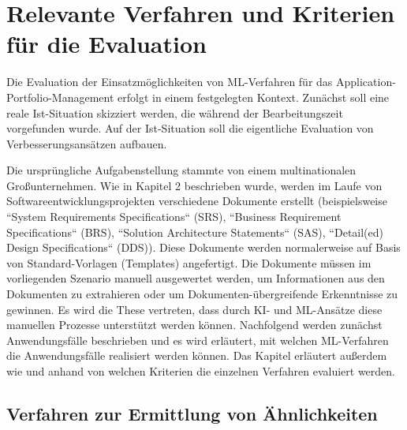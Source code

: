 \chapter{Relevante Verfahren und Kriterien für die Evaluation}
\label{kriterien}

Die Evaluation der Einsatzmöglichkeiten von ML-Verfahren für das Application-Portfolio-Management erfolgt in einem festgelegten Kontext. Zunächst soll eine reale Ist-Situation skizziert werden, die während der Bearbeitungszeit vorgefunden wurde.  Auf der Ist-Situation soll die eigentliche Evaluation von Verbesserungsansätzen aufbauen. 

Die ursprüngliche Aufgabenstellung stammte von einem multinationalen Großunternehmen. Wie in Kapitel 2 beschrieben wurde, werden im Laufe von Softwareentwicklungsprojekten verschiedene Dokumente erstellt (beispielsweise ``System Requirements Specifications`` (SRS), ``Business Requirement Specifications`` (BRS), ``Solution Architecture Statements`` (SAS), ``Detail(ed) Design Specifications`` (DDS)). Diese Dokumente werden normalerweise auf Basis von Standard-Vorlagen (Templates) angefertigt. Die Dokumente müssen im vorliegenden Szenario manuell ausgewertet werden, um Informationen aus den Dokumenten zu extrahieren oder um Dokumenten-übergreifende Erkenntnisse zu gewinnen. Es wird die These vertreten, dass durch KI- und ML-Ansätze diese manuellen Prozesse unterstützt werden können. Nachfolgend werden zunächst Anwendungsfälle beschrieben und es wird erläutert, mit welchen ML-Verfahren die Anwendungsfälle realisiert werden können. Das Kapitel erläutert außerdem wie und anhand von welchen Kriterien die einzelnen Verfahren evaluiert werden. 

\section{Verfahren zur Ermittlung von Ähnlichkeiten}


